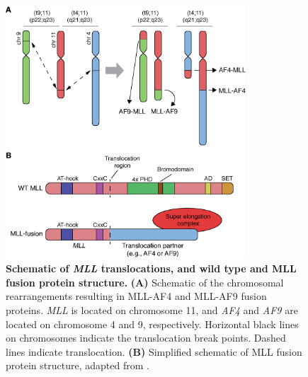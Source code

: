 \begin{figure}[htbp]
    \centering
    \includegraphics[width=0.8\textwidth,keepaspectratio]{figures/chapter1/ch1_mll-rearrange.png}
    \caption[{Schematic of \textit{MLL} translocations, and wild type and MLL fusion protein structure.}]
    {\textbf{Schematic of \textit{MLL} translocations, and wild type and MLL fusion protein structure.} 
    \textbf{(A)} Schematic of the chromosomal rearrangements resulting in MLL-AF4 and MLL-AF9 fusion proteins. \textit{MLL} is located on chromosome 11, and \textit{AF4} and \textit{AF9} are located on chromosome 4 and 9, respectively. Horizontal black lines on chromosomes indicate the translocation break points. Dashed lines indicate translocation. 
    \textbf{(B)} Simplified schematic of MLL fusion protein structure, adapted from \cite{winters_mll-rearranged_2017}.
    }
    \label{fig:ch1_mll-rearrange}
\end{figure}

